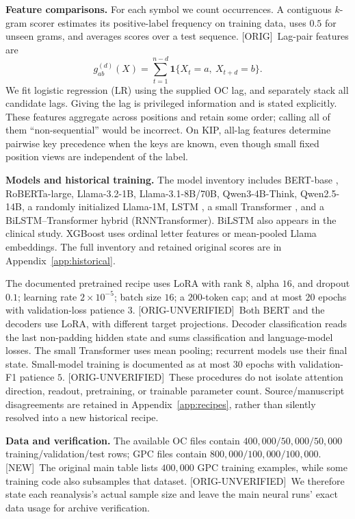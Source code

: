 \documentclass[10pt]{article}
\newcommand{\prov}[1]{{\color{black!65}\scriptsize[#1]}}
\newcommand{\orig}{\prov{ORIG}}
\newcommand{\ou}{\prov{ORIG-UNVERIFIED}}
\newcommand{\newres}{\prov{NEW}}
\newcommand{\ind}{\mathbf{1}}
\begin{document}
\textbf{Feature comparisons.} For each symbol we count occurrences. A contiguous $k$-gram scorer estimates its positive-label frequency on training data, uses $0.5$ for unseen grams, and averages scores over a test sequence. \orig\ Lag-pair features are
\begin{equation}
g_{ab}^{(d)}(X)=\sum_{t=1}^{n-d}\ind\{X_t=a,\ X_{t+d}=b\}.
\label{eq:pairs}
\end{equation}
We fit logistic regression (LR) using the supplied OC lag, and separately stack all candidate lags. Giving the lag is privileged information and is stated explicitly. These features aggregate across positions and retain some order; calling all of them ``non-sequential'' would be incorrect. On KIP, all-lag features determine pairwise key precedence when the keys are known, even though small fixed position views are independent of the label.

\textbf{Models and historical training.} The model inventory includes BERT-base \citep{devlin2019}, RoBERTa-large, Llama-3.2-1B, Llama-3.1-8B/70B, Qwen3-4B-Think, Qwen2.5-14B, a randomly initialized Llama-1M, LSTM \citep{hochreiter1997}, a small Transformer \citep{vaswani2017}, and a BiLSTM--Transformer hybrid (RNNTransformer). BiLSTM also appears in the clinical study. XGBoost \citep{chen2016} uses ordinal letter features or mean-pooled Llama embeddings. The full inventory and retained original scores are in Appendix~\ref{app:historical}.

The documented pretrained recipe uses LoRA \citep{hu2022} with rank $8$, alpha $16$, and dropout $0.1$; learning rate $2\times10^{-5}$; batch size $16$; a $200$-token cap; and at most $20$ epochs with validation-loss patience $3$. \ou\ Both BERT and the decoders use LoRA, with different target projections. Decoder classification reads the last non-padding hidden state and sums classification and language-model losses. The small Transformer uses mean pooling; recurrent models use their final state. Small-model training is documented as at most $30$ epochs with validation-F1 patience $5$. \ou\ These procedures do not isolate attention direction, readout, pretraining, or trainable parameter count. Source/manuscript disagreements are retained in Appendix~\ref{app:recipes}, rather than silently resolved into a new historical recipe.

\textbf{Data and verification.} The available OC files contain $400{,}000/50{,}000/50{,}000$ training/validation/test rows; GPC files contain $800{,}000/100{,}000/100{,}000$. \newres\ The original main table lists $400{,}000$ GPC training examples, while some training code also subsamples that dataset. \ou\ We therefore state each reanalysis's actual sample size and leave the main neural runs' exact data usage for archive verification.
\end{document}
